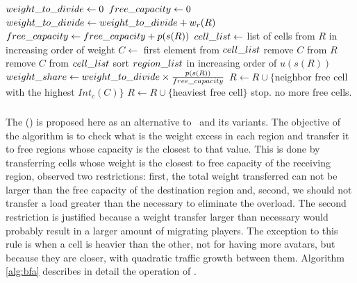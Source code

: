 \begin{algorithm}
\caption{\ggpf}
\label{alg:ggpf}
\begin{algorithmic}[1]
	 \STATE $weight\_to\_divide \leftarrow 0$
	 \STATE $free\_capacity \leftarrow 0$
	 		\STATE $weight\_to\_divide \leftarrow weight\_to\_divide + w_r(R)$
	 		\STATE $free\_capacity \leftarrow free\_capacity + p(s(R))$
	 		\STATE $cell\_list \leftarrow $ list of cells from $R$ in increasing order of weight
	 			 \STATE $C \leftarrow$ first element from $cell\_list$
	 			 \STATE remove $C$ from $R$
	 			 \STATE remove $C$ from $cell\_list$
	 		\ENDWHILE
	 \ENDFOR
	 \STATE sort $region\_list$ in increasing order of $u(s(R))$ \label{alg:ggpf:usageorder}
	 		\STATE $weight\_share \leftarrow weight\_to\_divide \times \frac{p(s(R))}{free\_capacity}$
	 		 \label{alg:ggpf:whilefraction}
	 		   		\STATE $R \leftarrow R \cup \{$neighbor free cell with the highest $Int_c(C)$$\}$
	 		   		\STATE $R \leftarrow R \cup \{$heaviest free cell$\}$ \label{alg:ggpf:freeheavycell}
	 		   \ELSE
	 		   		\STATE stop. no more free cells.
	 		   \ENDIF
	 		\ENDWHILE
	 \ENDFOR\end{algorithmic}
\end{algorithm}

\subsubsection{\bfa} %
\label{sec:alg:bfa}

The \textbf{\bfa} (\bfameaning) is proposed here as an alternative to \ggp\ and its variants. The objective of the algorithm is to check what is the weight excess in each region and transfer it to free regions whose capacity is the closest to that value. This is done by transferring cells whose weight is the closest to free capacity of the receiving region, observed two restrictions: first, the total weight transferred can not be larger than the free capacity of the destination region and, second, we should not transfer a load greater than the necessary to eliminate the overload. The second restriction is justified because a weight transfer larger than necessary would probably result in a larger amount of migrating players. The exception to this rule is when a cell is heavier than the other, not for having more avatars, but because they are closer, with quadratic traffic growth between them. Algorithm \ref{alg:bfa} describes in detail the operation of \bfa.


